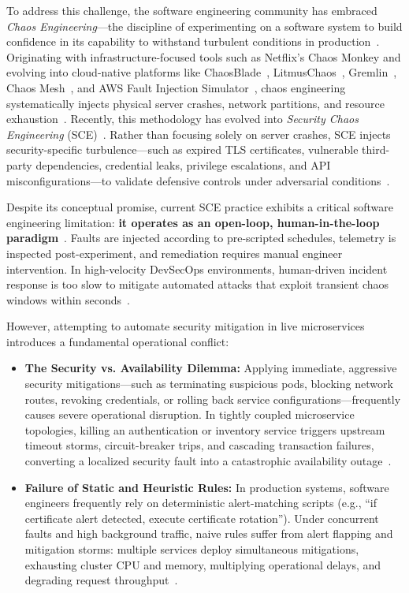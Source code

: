 \documentclass[ASNA,twocolumn]{USG}
\begin{document}
To address this challenge, the software engineering community has embraced \textit{Chaos Engineering}—the discipline of experimenting on a software system to build confidence in its capability to withstand turbulent conditions in production~\cite{basiri2016chaos, rosenthal2020chaos}. Originating with infrastructure-focused tools such as Netflix's Chaos Monkey and evolving into cloud-native platforms like ChaosBlade~\cite{chaosblade2021}, LitmusChaos~\cite{litmus2022}, Gremlin~\cite{gremlin2022}, Chaos Mesh~\cite{chaosmesh2021}, and AWS Fault Injection Simulator~\cite{awsfis2023}, chaos engineering systematically injects physical server crashes, network partitions, and resource exhaustion~\cite{camacho2022chaos, esen2025chaos, baghorn2022fault}. Recently, this methodology has evolved into \textit{Security Chaos Engineering} (SCE)~\cite{shortridge2023security, myrbakken2021security}. Rather than focusing solely on server crashes, SCE injects security-specific turbulence—such as expired TLS certificates, vulnerable third-party dependencies, credential leaks, privilege escalations, and API misconfigurations—to validate defensive controls under adversarial conditions~\cite{myrbakken2021security, bedoya2024enhancing}.

Despite its conceptual promise, current SCE practice exhibits a critical software engineering limitation: \textbf{it operates as an open-loop, human-in-the-loop paradigm}~\cite{owotogbe2025chaos, shortridge2023security}. Faults are injected according to pre-scripted schedules, telemetry is inspected post-experiment, and remediation requires manual engineer intervention. In high-velocity DevSecOps environments, human-driven incident response is too slow to mitigate automated attacks that exploit transient chaos windows within seconds~\cite{shortridge2023security, liu2025autonomous}.

However, attempting to automate security mitigation in live microservices introduces a fundamental operational conflict:
\begin{itemize}
    \item \textbf{The Security vs. Availability Dilemma:} Applying immediate, aggressive security mitigations—such as terminating suspicious pods, blocking network routes, revoking credentials, or rolling back service configurations—frequently causes severe operational disruption. In tightly coupled microservice topologies, killing an authentication or inventory service triggers upstream timeout storms, circuit-breaker trips, and cascading transaction failures, converting a localized security fault into a catastrophic availability outage~\cite{aderaldo2025declarative, schneider2015survey}.
    \item \textbf{Failure of Static and Heuristic Rules:} In production systems, software engineers frequently rely on deterministic alert-matching scripts (e.g., ``if certificate alert detected, execute certificate rotation''). Under concurrent faults and high background traffic, naive rules suffer from alert flapping and mitigation storms: multiple services deploy simultaneous mitigations, exhausting cluster CPU and memory, multiplying operational delays, and degrading request throughput~\cite{schneider2015survey}.
\end{itemize}
\end{document}
